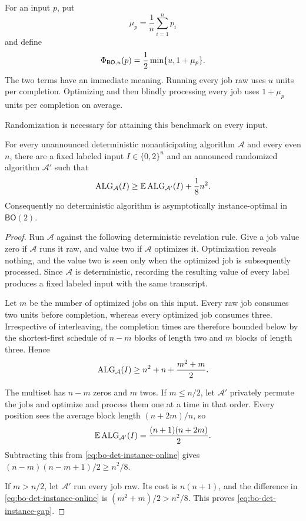For an input $p$, put
\[
 \mu_p=\frac1n\sum_{i=1}^n p_i
\]
and define
\begin{equation}
 \Phi_{\mathsf{BO},u}(p)=\frac12\min\{u,1+\mu_p\}.
 \label{eq:bo-phi}
\end{equation}
The two terms have an immediate meaning.  Running every job raw uses $u$
units per completion.  Optimizing and then blindly processing every job uses
$1+\mu_p$ units per completion on average.

Randomization is necessary for attaining this benchmark on every input.

\begin{theorem}
\label{thm:bo-det-not-instance-optimal}
For every unannounced deterministic nonanticipating algorithm $\mathcal A$ and
every even $n$, there are a fixed labeled input $I\in\{0,2\}^n$ and an
announced randomized algorithm $\mathcal A'$ such
that
\begin{equation}
 \operatorname{ALG}_{\mathcal A}(I)
 \ge \mathbb{E}\operatorname{ALG}_{\mathcal A'}(I)+\frac18n^2.
 \label{eq:bo-det-instance-gap}
\end{equation}
Consequently no deterministic algorithm is asymptotically instance-optimal in
$\mathsf{BO}(2)$.
\end{theorem}

\begin{proof}
Run $\mathcal A$ against the following deterministic revelation rule.  Give
a job value zero if $\mathcal A$ runs it raw, and value two if $\mathcal A$
optimizes it.  Optimization reveals nothing, and the value two is seen only
when the optimized job is subsequently processed.  Since $\mathcal A$ is
deterministic, recording the resulting value of every label produces a fixed
labeled input with the same transcript.

Let $m$ be the number of optimized jobs on this input.  Every raw job consumes
two units before completion, whereas every optimized job consumes three.
Irrespective of interleaving, the completion times are therefore bounded
below by the shortest-first schedule of $n-m$ blocks of length two and $m$
blocks of length three.  Hence
\begin{equation}
 \operatorname{ALG}_{\mathcal A}(I)
 \ge n^2+n+\frac{m^2+m}{2}.
 \label{eq:bo-det-instance-online}
\end{equation}

The multiset has $n-m$ zeros and $m$ twos.  If $m\le n/2$, let
$\mathcal A'$ privately permute the jobs and optimize and process them one at
a time in that order.  Every position sees the average block length
$(n+2m)/n$, so
\begin{equation}
 \mathbb{E}\operatorname{ALG}_{\mathcal A'}(I)=\frac{(n+1)(n+2m)}2.
 \label{eq:bo-det-instance-comparator-opt}
\end{equation}
Subtracting this from \cref{eq:bo-det-instance-online} gives
$(n-m)(n-m+1)/2\ge n^2/8$.

If $m>n/2$, let $\mathcal A'$ run every job raw.  Its cost is $n(n+1)$, and
the difference in \cref{eq:bo-det-instance-online} is
$(m^2+m)/2>n^2/8$.  This proves \cref{eq:bo-det-instance-gap}.
\end{proof}

